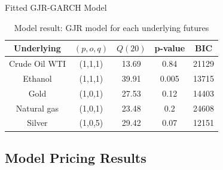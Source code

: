 \documentclass[8pt]{beamer}
\numberwithin{equation}{section}
\begin{document}
\begin{frame}{Fitted GJR-GARCH Model}
\begin{table}[!ht]
\centering
\begin{tabular}{ccccc}
\toprule
Underlying & $ (p, o, q) $ & $ Q(20) $ & p-value & BIC \\
\midrule
Crude Oil WTI & (1,1,1) & 13.69 & 0.84 & 21129 \\
Ethanol & (1,1,1) & 39.91 & 0.005 & 13715 \\
Gold & (1,0,1) & 27.53 & 0.12 & 14403  \\
Natural gas & (1,0,1) & 23.48 & 0.2 & 24608 \\
Silver & (1,0,5) & 29.42 & 0.07 & 12151 \\
\bottomrule
\end{tabular}
\caption{Model result: GJR model for each underlying futures}
\label{model result}
\end{table}
\end{frame}

\subsection{Model Pricing Results}
\end{document}
